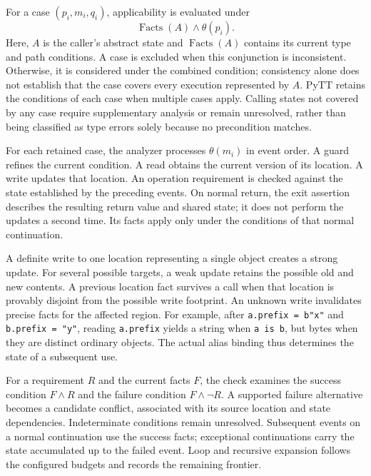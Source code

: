 For a case $(p_i,m_i,q_i)$, applicability is evaluated under
\begin{equation}
\operatorname{Facts}(A)\land\theta(p_i).
\label{eq:applicability}
\end{equation}
Here, $A$ is the caller's abstract state and $\operatorname{Facts}(A)$
contains its current type and path conditions. A case is excluded when
this conjunction is inconsistent. Otherwise, it is considered under the
combined condition; consistency alone does not establish that the case
covers every execution represented by $A$. PyTT retains the conditions of
each case when multiple cases apply. Calling states not covered by any
case require supplementary analysis or remain unresolved, rather than
being classified as type errors solely because no precondition matches.

For each retained case, the analyzer processes $\theta(m_i)$ in event
order. A guard refines
the current condition. A read obtains the current version of its location.
A write updates that location. An operation requirement is checked against
the state established by the preceding events. On normal return, the exit
assertion describes the resulting return value and shared state; it does
not perform the updates a second time. Its facts apply only under the
conditions of that normal continuation.

A definite write to one location representing a single object creates a strong update.
For several possible targets, a weak update retains the possible old and
new contents. A previous location fact survives a call when that location
is provably disjoint from the possible write footprint. An unknown write
invalidates precise facts for the affected region. For example, after \texttt{a.prefix = b"x"} and
\texttt{b.prefix = "y"}, reading \texttt{a.prefix} yields a string
when \texttt{a is b}, but bytes when they are distinct ordinary objects.
The actual alias binding thus determines the state of a subsequent use.

For a requirement $R$ and the current facts $F$, the check examines the
success condition $F\land R$ and the failure condition $F\land\neg R$.
A supported failure alternative becomes a candidate conflict, associated
with its source location and state dependencies. Indeterminate conditions
remain unresolved. Subsequent events on a normal continuation use the
success facts; exceptional continuations carry the state accumulated up
to the failed event. Loop and recursive expansion follows the configured
budgets and records the remaining frontier.

